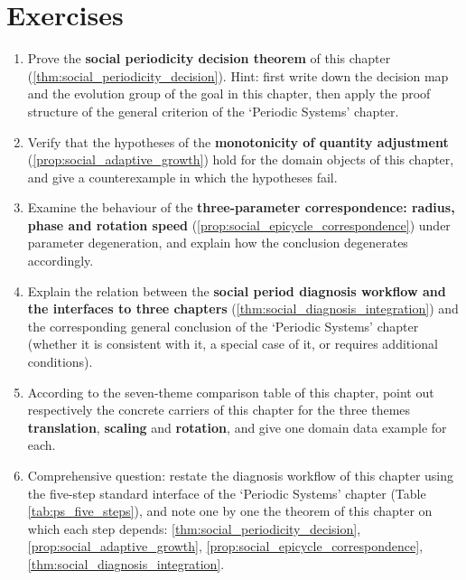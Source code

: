 \section*{Exercises}

\begin{enumerate}[leftmargin=3em, label=\textbf{Exercise \arabic*}]
    \item Prove the \textbf{social periodicity decision theorem} of this chapter (\ref{thm:social_periodicity_decision}). Hint: first write down the decision map and the evolution group of the goal in this chapter, then apply the proof structure of the general criterion of the `Periodic Systems' chapter.

    \item Verify that the hypotheses of the \textbf{monotonicity of quantity adjustment} (\ref{prop:social_adaptive_growth}) hold for the domain objects of this chapter, and give a counterexample in which the hypotheses fail.

    \item Examine the behaviour of the \textbf{three-parameter correspondence: radius, phase and rotation speed} (\ref{prop:social_epicycle_correspondence}) under parameter degeneration, and explain how the conclusion degenerates accordingly.

    \item Explain the relation between the \textbf{social period diagnosis workflow and the interfaces to three chapters} (\ref{thm:social_diagnosis_integration}) and the corresponding general conclusion of the `Periodic Systems' chapter (whether it is consistent with it, a special case of it, or requires additional conditions).

    \item According to the seven-theme comparison table of this chapter, point out respectively the concrete carriers of this chapter for the three themes \textbf{translation}, \textbf{scaling} and \textbf{rotation}, and give one domain data example for each.

    \item Comprehensive question: restate the diagnosis workflow of this chapter using the five-step standard interface of the `Periodic Systems' chapter (Table \ref{tab:ps_five_steps}), and note one by one the theorem of this chapter on which each step depends: \ref{thm:social_periodicity_decision}, \ref{prop:social_adaptive_growth}, \ref{prop:social_epicycle_correspondence}, \ref{thm:social_diagnosis_integration}.
\end{enumerate}

